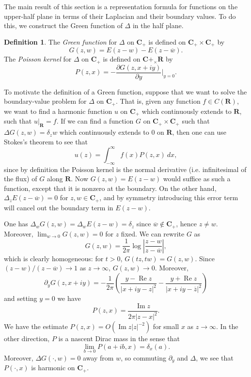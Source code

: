 \documentclass[12pt]{report}
\newcommand{\RR}{\mathbf{R}}
\newcommand{\CC}{\mathbf{C}}
\newcommand{\dfn}[1]{\emph{#1}\index{#1}}
\renewcommand{\Re}{\operatorname{Re}}
\renewcommand{\Im}{\operatorname{Im}}
\theoremstyle{definition}
\newtheorem{definition}[theorem]{Definition}
\theoremstyle{remark}
\begin{document}
The main result of this section is a representation formula for functions on the upper-half plane in terms of their Laplacian and their boundary values. To do this, we construct the Green function of $\Delta$ in the half plane.
\begin{definition}
    The \dfn{Green function} for $\Delta$ on $\CC_+$ is defined on $\CC_+ \times \CC_+$ by
$$G(z, w) = E(z - w) - E(z - \overline w).$$
    The \dfn{Poisson kernel} for $\Delta$ on $\CC_+$ is defined on $\CC+_ \times \RR$ by
$$P(z, x) = -\frac{\partial G(z, x + iy)}{\partial y}|_{y = 0}.$$
\end{definition}
  To motivate the definition of a Green function, suppose that we want to solve the boundary-value problem for $\Delta$ on $\CC_+$. That is, given any function $f \in C(\RR)$, we want to find a harmonic function $u$ on $\CC_+$ which continuously extends to $\RR$, such that $u|_\RR = f$. If we can find a function $G$ on $\CC_+ \times \CC_+$ such that $\Delta G(z, w) = \delta_z w$ which continuously extends to $0$ on $\RR$, then one can use Stokes's theorem to see that
$$u(z) = \int_{-\infty}^\infty f(x) P(z, x) ~dx,$$
  since by definition the Poisson kernel is the normal derivative (i.e. infinitesimal of the flux) of $G$ along $\RR$. Now $G(z, w) = E(z - w)$ would suffice as such a function, except that it is nonzero at the boundary. On the other hand, $\Delta_z E(z - \overline w) = 0$ for $z, w \in \CC_+$, and by symmetry introducing this error term will cancel out the boundary term in $E(z - w)$.

    One has $\Delta_w G(z, w) = \Delta_w E(z - w) = \delta_z$ since $\overline w \notin \CC_+$, hence $z \neq w$. Moreover, $\lim_{w \to 0} G(z, w) = 0$ for $z$ fixed. We can rewrite $G$ as
$$G(z, w) = \frac{1}{2\pi} \log\left|\frac{z - w}{z - \overline w}\right|,$$
    which is clearly homogeneous: for $t > 0$, $G(tz, tw) = G(z, w)$. Since $(z-w)/(z - \overline w) \to 1$ as $z \to \infty$, $G(z, w) \to 0$.  Moreover,
$$\partial_y G(z, x + iy) = -\frac{1}{2\pi} \left(\frac{y - \Re z}{|x + iy - z|^2} - \frac{y + \Re z}{|x + iy - \overline z|^2}\right)$$
  and setting $y = 0$ we have
$$P(z, x) = \frac{\Im z}{2\pi|z-x|^2}.$$
We have the estimate $P(z, x) = O(\Im z|z|^{-2})$ for small $x$ as $z \to \infty$. In the other direction, $P$ is a nascent Dirac mass in the sense that
$$\lim_{b \to 0} P(a + ib, x) = \delta_x(a).$$ Moreover, $\Delta G(\cdot, w) = 0$ away from $w$, so commuting $\partial_y$ and $\Delta$, we see that $P(\cdot, x)$ is harmonic on $\CC_+$.
\end{document}
